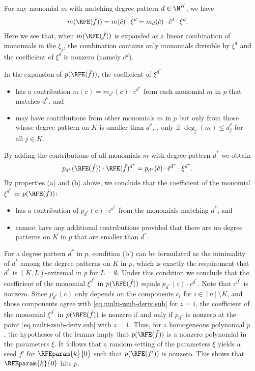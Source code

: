 \documentclass{toc}
\begin{document}
For any monomial \(m\) with matching degree pattern \(d \in \N^K\),
we have
\[
  m(\RFE(\hat{f}))
  =
  m(\hat{c}) \cdot \xi^{d}
  =
  m_{d}(\hat{c}) \cdot \hat{c}^{d} \cdot \xi^{d}.
\]
Here we see that,
when \(m(\RFE(\hat{f}))\) is expanded as a linear combination of monomials in
the \(\xi_j\),
the combination contains only monomials divisible by \(\xi^d\) and the coefficient of \(\xi^d\) is nonzero (namely $c^{d}$). 

In the expansion of \(p(\RFE(\hat{f}))\),
the coefficient of \(\xi^{d^*}\)
\begin{itemize}
  \item[(a)] has a contribution $m(c) = m_{d^*}(c) \cdot c^{d^*}$ from each
    monomial $m$ in $p$ that matches \(d^*\), and
  \item[(b)] may have contributions from other monomials $m$ in $p$
    but only from those whose degree pattern on $K$ is smaller than $d^*$,
    \ie, only if $\deg_j(m) \le d^*_j$ for all $j \in K$.
\end{itemize}
By adding the contributions of all monomials $m$ with degree pattern $d^*$ we obtain
\[ p_{d^*}(\RFE(\hat{f})) \cdot \RFE(\hat{f})^{d^*} = p_{d^*}(\hat{c}) \cdot \hat{c}^{d^*} \cdot \xi^{d^*}.\]
By properties (a) and (b) above,
we conclude that the coefficient of the monomial $\xi^{d^*}$ in
$p(\RFE(\hat{f}))$:
\begin{itemize}
  \item[(a')] has a contribution of $p_{d^*}(c) \cdot c^{d^*}$ from the
    monomials matching $d^*$, and
  \item[(b')] cannot have any additional contributions provided that there are
    no degree patterns on $K$ in $p$ that are smaller than $d^*$.
\end{itemize}
For a degree pattern $d^*$ in $p$,
condition (b') can be formulated as the minimality of $d^*$ among the degree
patterns on $K$ in $p$,
which is exactly the requirement that $d^*$ is $(K,L)$-extremal in $p$
for $L = \emptyset$.
Under this condition we conclude that the coefficient of the monomial
$\xi^{d^*}$ in $p(\RFE(\hat{f}))$ equals $p_{d^*}(c) \cdot c^{d^*}$.
Note that $c^{d^*}$ is nonzero.
Since $p_{d^*}(c)$ only depends on the components $c_i$
for $i \in [n] \setminus K$,
and those components agree with \eqref{eq.multi-zsub-deriv.sub} for $z=1$,
the coefficient of the monomial $\xi^{d^*}$ in $p(\RFE(\hat{f}))$ is nonzero
if and only if $p_{d^*}$ is nonzero at the point
\eqref{eq.multi-zsub-deriv.sub} with $z=1$.
Thus, for a homogeneous polynomial $p$, the hypotheses of the lemma imply that
$p(\RFE(\hat{f}))$ is a nonzero polynomial in the parameters $\xi$.
It follows that a random setting of the parameters $\xi$ yields a seed $f'$
for $\RFEparam{k}{0}$ such that $p(\RFE(f'))$ is nonzero.
This shows that $\RFEparam{k}{0}$ hits $p$.
\end{document}
